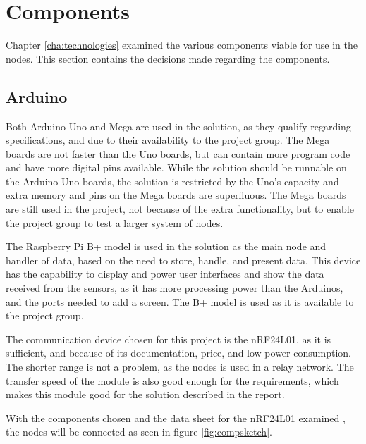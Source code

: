 \section{Components}
Chapter \ref{cha:technologies} examined the various components viable for use in the nodes. This section contains the decisions made regarding the components.

\subsection{Arduino}
Both Arduino Uno and Mega are used in the solution, as they qualify regarding specifications, and due to their availability to the project group. The Mega boards are not faster than the Uno boards, but can contain more program code and have more digital pins available. While the solution should be runnable on the Arduino Uno boards, the solution is restricted by the Uno's capacity and extra memory and pins on the Mega boards are superfluous. The Mega boards are still used in the project, not because of the extra functionality, but to enable the project group to test a larger system of nodes.

The Raspberry Pi B+ model is used in the solution as the main node and handler of data, based on the need to store, handle, and present data. This device has the capability to display and power user interfaces and show the data received from the sensors, as it has more processing power than the Arduinos, and the ports needed to add a screen. The B+ model is used as it is available to the project group.

The communication device chosen for this project is the nRF24L01, as it is sufficient, and because of its documentation, price, and low power consumption. The shorter range is not a problem, as the nodes is used in a relay network. The transfer speed of the module is also good enough for the requirements, which makes this module good for the solution described in the report.

With the components chosen and the data sheet for the nRF24L01 examined \cite{nf24datasheet}, the nodes will be connected as seen in figure \ref{fig:compsketch}.

